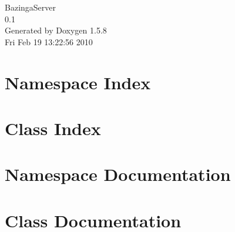 \documentclass[a4paper]{book}
\begin{document}
\begin{titlepage}
\vspace*{7cm}
\begin{center}
{\Large BazingaServer \\[1ex]\large 0.1 }\\
\vspace*{1cm}
{\large Generated by Doxygen 1.5.8}\\
\vspace*{0.5cm}
{\small Fri Feb 19 13:22:56 2010}\\
\end{center}
\end{titlepage}
\clearemptydoublepage
{}
\tableofcontents
\clearemptydoublepage
{}
\chapter{Namespace Index}

\chapter{Class Index}

\chapter{Namespace Documentation}


\chapter{Class Documentation}














\printindex
\end{document}
